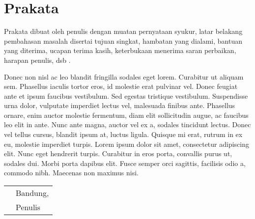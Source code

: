 \chapter*{Prakata}

Prakata dibuat oleh penulis dengan muatan pernyataan syukur, latar belakang pembahasan masalah disertai tujuan singkat, hambatan yang dialami, bantuan yang diterima, ucapan terima kasih, keterbukaan menerima saran perbaikan, harapan penulis, dsb \autocite{penulisanilteks}.

Donec non nisl ac leo blandit fringilla sodales eget lorem. Curabitur ut aliquam sem. Phasellus iaculis tortor eros, id molestie erat pulvinar vel. Donec feugiat ante et ipsum faucibus vestibulum. Sed egestas tristique vestibulum. Suspendisse urna dolor, vulputate imperdiet lectus vel, malesuada finibus ante. Phasellus ornare, enim auctor molestie fermentum, diam elit sollicitudin augue, ac faucibus leo elit in ante. Nunc ante magna, auctor vel ex a, sodales tincidunt lectus. Donec vel tellus cursus, blandit ipsum at, luctus ligula. Quisque mi erat, rutrum in ex eu, molestie imperdiet turpis. Lorem ipsum dolor sit amet, consectetur adipiscing elit. Nunc eget hendrerit turpis. Curabitur in eros porta, convallis purus ut, sodales dui. Morbi porta dapibus elit. Fusce semper orci sagittis, facilisis odio a, commodo nibh. Maecenas non maximus nisi.

\vspace{15mm}
\begin{tabularx}{\textwidth}{l@{\hskip 0.635\textwidth}l}
    & Bandung, \thedate{} \yearsidang{}\\
    & Penulis
\end{tabularx}
